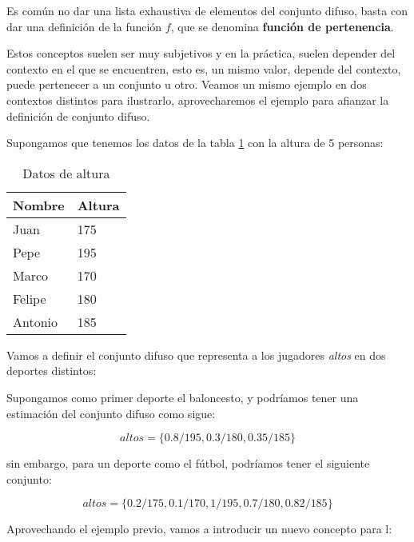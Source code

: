 Es común no dar una lista exhaustiva de elementos del conjunto difuso, basta con dar una definición de la función $f$, que se denomina \textbf{función de pertenencia}.

Estos conceptos suelen ser muy subjetivos y en la práctica, suelen depender del contexto en el que se encuentren, esto es, un mismo valor, depende del contexto, puede pertenecer a un conjunto u otro. Veamos un mismo ejemplo en dos contextos distintos para ilustrarlo, aprovecharemos el ejemplo para afianzar la definición de conjunto difuso.

\begin{example}
Supongamos que tenemos los datos de la tabla \ref{datatable} con la altura de 5 personas:

\begin{table}[h]
\centering
\begin{tabular}{|l|l|}
\hline
\textbf{Nombre} & \textbf{Altura} \\ \hline
Juan            & 175             \\ \hline
Pepe            & 195             \\ \hline
Marco           & 170             \\ \hline
Felipe          & 180             \\ \hline
Antonio         & 185             \\ \hline
\end{tabular}
\caption{Datos de altura}
\label{datatable}
\end{table}

Vamos a definir el conjunto difuso que representa a los jugadores \textit{altos} en dos deportes distintos:

Supongamos como primer deporte el baloncesto, y podríamos tener una estimación del conjunto difuso como sigue:

\begin{equation*}
    altos = \{0.8/195, 0.3/180, 0.35/185\}
\end{equation*}

sin embargo, para un deporte como el fútbol, podríamos tener el siguiente conjunto:

\begin{equation*}
    altos = \{0.2/175, 0.1/170, 1/195, 0.7/180, 0.82/185\}
\end{equation*}

\end{example}

Aprovechando el ejemplo previo, vamos a introducir un nuevo concepto para l:

